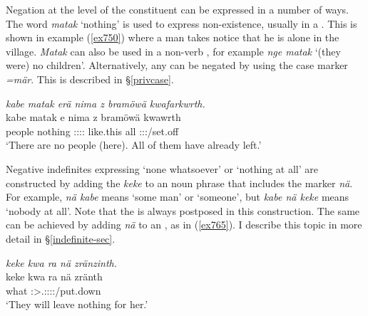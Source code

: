Negation at the level of the constituent can be expressed in a number of ways. The word \emph{matak} `nothing' is used to express non-existence, usually in a  . This is shown in example (\ref{ex750}) where a man takes notice that he is alone in the village. \emph{Matak} can also be used in a non-verb , for example \emph{nge matak} `(they were) no children'. Alternatively, any  can be negated by using the  case marker \emph{=mär}. This is described in \S\ref{privcase}.

\begin{exe}
	\ex \emph{kabe matak erä nima z bramöwä kwafarkwrth.}\\
	\gll kabe matak e nima z bramöwä kwawrth\\
	people nothing \Stpl:\Sbj:\Nonpast:\Ipfv:\Cop{} like.this {\Iam} all \Stpl:\Sbj:\Rpst:\Ipfv/set.off\\
	\trans `There are no people (here). All of them have already left.'
	\label{ex750}
\end{exe}

Negative indefinites expressing `none whatsoever' or `nothing at all' are constructed by adding the  \emph{keke} to an noun phrase that includes the  marker \emph{nä}. For example, \emph{nä kabe} means `some man' or `someone', but \emph{kabe nä keke} means `nobody at all'. Note that the  is always postposed in this construction. The same can be achieved by adding \emph{nä} to an , as in (\ref{ex765}). I describe this topic in more detail in \S\ref{indefinite-sec}.

\begin{exe}
	\ex \emph{keke kwa ra nä zränzinth.}\\
	\gll keke kwa ra nä zränth\\
	{\Neg} {\Fut} what {\Indf} \Stpl:\Sbj>\Tsg.\F:\Io:\Irr:\Pfv:\Venit/put.down\\
	\trans `They will leave nothing for her.'
	\label{ex765}
\end{exe}
